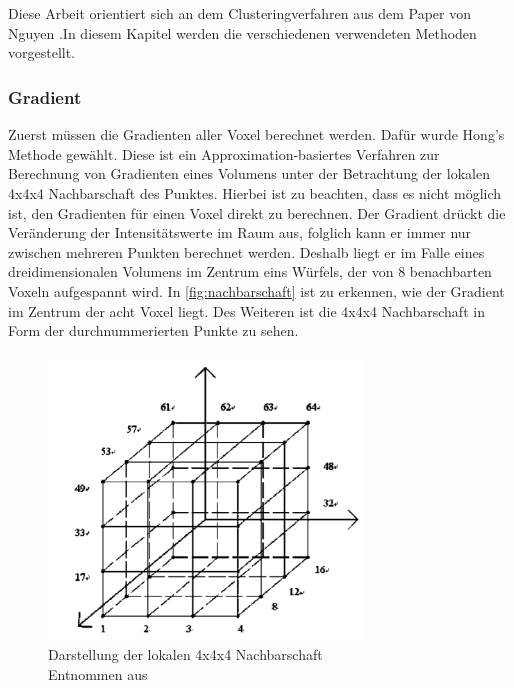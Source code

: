 \chapter{}
\label{sec:methods}

Diese Arbeit orientiert sich an dem Clusteringverfahren aus dem Paper von Nguyen \cite{nguyen2012clustering}.In diesem Kapitel werden die verschiedenen verwendeten Methoden vorgestellt.

\subsection{Gradient}

Zuerst müssen die Gradienten aller Voxel berechnet werden. Dafür wurde Hong's Methode \cite{hong2003method} gewählt. Diese ist ein Approximation-basiertes Verfahren zur Berechnung von Gradienten eines Volumens unter der Betrachtung der lokalen 4x4x4 Nachbarschaft des Punktes.
\newline
Hierbei ist zu beachten, dass es nicht möglich ist, den Gradienten für einen Voxel direkt zu berechnen. Der Gradient drückt die Veränderung der Intensitätswerte im Raum aus, folglich kann er immer nur zwischen mehreren Punkten berechnet werden. Deshalb liegt er im Falle eines dreidimensionalen Volumens im Zentrum eins Würfels, der von 8 benachbarten Voxeln aufgespannt wird.
\newline
In \autoref{fig:nachbarschaft} ist zu erkennen, wie der Gradient im Zentrum der acht Voxel liegt. Des Weiteren ist die 4x4x4 Nachbarschaft in Form der durchnummerierten Punkte zu sehen.
\newline

\begin{figure}[!h] 
\centering 
\includegraphics[width=0.75\textwidth]{Logos/VoxelEdges.PNG}
\caption{Darstellung der lokalen 4x4x4 Nachbarschaft  \\ Entnommen aus \protect\cite{hong2003method}} 
\label{fig:nachbarschaft} 
\end{figure}


